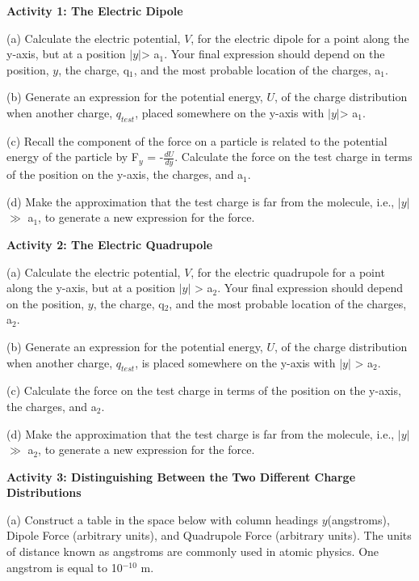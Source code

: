 \textbf{Activity 1: The Electric Dipole }

(a) Calculate the electric potential, \( V \), for the electric dipole for
a point along the y-axis, but at a position \( \left| y\right|  \)>
a\( _{1} \). Your final expression should depend on the position,
\( y \), the charge, q\( _{1} \), and the most probable location of the
charges, a\( _{1} \).
\answerspace{20mm}

\pagebreak
(b) Generate an expression for the potential energy, \( U \), of the charge
distribution when another charge, $q_{test}$,  placed somewhere
on the y-axis with \( \left| y\right|  \)> a\( _{1} \).
\answerspace{20mm}

(c) Recall the component of the force on a particle is related to
the potential energy of the particle by F\( _{y} \) = -\( \frac{dU}{dy} \).
Calculate the force on the test charge in terms of the position on
the y-axis, the charges, and a\( _{1} \).
\answerspace{20mm}

(d) Make the approximation that the test charge is far from the molecule,
i.e., \( \left| y\right|  \) \( \gg  \) a\( _{1} \), to generate
a new expression for the force.
\answerspace{20mm}

\textbf{Activity 2: The Electric Quadrupole} 

(a) Calculate the electric potential, \( V \), for the electric quadrupole
for a point along the y-axis, but at a position \( \left| y\right|  \)
> a\( _{2} \). Your final expression should depend on the position,
\( y \), the charge, q\( _{2} \), and the most probable location of the
charges, a\( _{2} \).
\answerspace{20mm}

(b) Generate an expression for the potential energy, \( U \), of the charge
distribution when another charge, $q_{test}$, is placed somewhere
on the y-axis with \( \left| y\right|  \) > a\( _{2} \).
\answerspace{20mm}

(c) Calculate the force on the test charge in terms of the position
on the y-axis, the charges, and a\( _{2} \).
\answerspace{25mm}

\pagebreak
(d) Make the approximation that the test charge is far from the molecule,
i.e., \( \left| y\right|  \) \( \gg  \) a\( _{2} \), to generate
a new expression for the force.
\answerspace{25mm}

\textbf{Activity 3: Distinguishing Between the Two Different Charge
Distributions} 

(a) Construct a table in the space below with column headings \( y \)(angstroms),
Dipole Force (arbitrary units), and Quadrupole Force (arbitrary units).
The units of distance known as angstroms are commonly used in atomic
physics. One angstrom is equal to 10\( ^{-10} \) m.
\answerspace{25mm}

